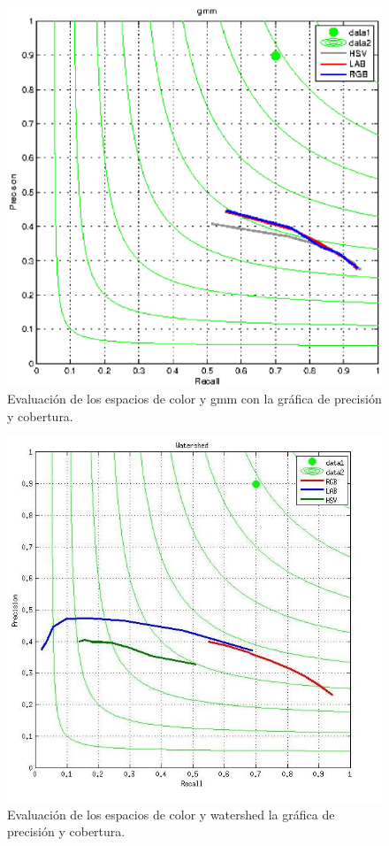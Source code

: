 \documentclass[10pt,twocolumn,letterpaper]{article}
\begin{document}
\begin{figure}[ht]
\begin{center}
 \includegraphics[scale=0.4]{gmmis.eps}
\end{center}
   \caption{Evaluación de los espacios de color y gmm con la gráfica de precisión y cobertura.}
\label{fig:long}
\label{fig:onecol}
\end{figure}

\begin{figure}[ht]
\begin{center}
   \includegraphics[scale=0.4]{watershed.jpg}
\end{center}
   \caption{Evaluación de los espacios de color y watershed la gráfica de precisión y cobertura. }
\label{fig:long}
\label{fig:onecol}
\end{figure}
\end{document}
